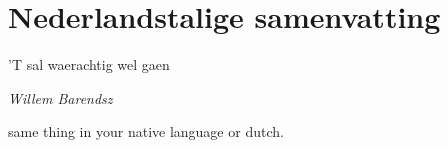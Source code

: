 \chapter{Nederlandstalige samenvatting}
\thispagestyle{noheadrule}
\markboth{}{}
\label{ch:layman-summary}

\pgfmathsetmacro\chapclr{\colourarray[8]}
\hypersetup{
citecolor  = \chapclr,
linkcolor  = \chapclr,
urlcolor   = \chapclr,
}

\epigraph{
  'T sal waerachtig wel gaen
}{
  \textit{Willem Barendsz}
}
\begin{otherlanguage}{dutch}
  same thing in your native language or dutch.
\end{otherlanguage}
